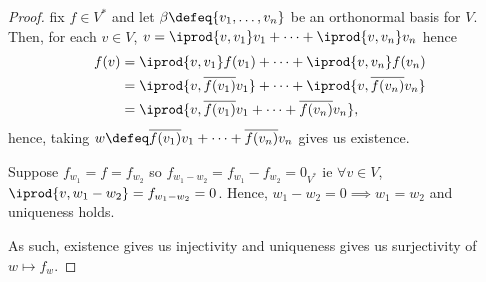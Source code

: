 \begin{proof}
     fix $f \in V^\ast$ and let $\beta \defeq \{v_1, \dots, v_n\}$ be an orthonormal basis for $V$. Then, for each $v\in V$, $v = \iprod{v, v_1} v_1 + \cdots + \iprod{v, v_n} v_n$ hence \begin{align*}
        f(v) &= \iprod{v, v_1} f(v_1) + \cdots + \iprod{v, v_n}f(v_n)\\
        &= \iprod{v, \overline{f(v_1)}v_1} + \cdots + \iprod{v, \overline{f(v_n)}v_n}\\
        &= \iprod{v, \overline{f(v_1)}v_1 + \cdots + \overline{f(v_n)}v_n},
    \end{align*}
    hence, taking $w \defeq \overline{f(v_1)}v_1 + \cdots + \overline{f(v_n)}v_n$ gives us existence.
    
     Suppose $f_{w_1} = f = f_{w_2}$ so $f_{w_1 - w_2} = f_{w_1} - f_{w_2} = 0_{V^\ast}$ ie $\forall v \in V$, $\iprod{v, w_1 - w_2} = f_{w_1 - w_2} = 0$. Hence, $w_1 - w_2 = 0 \implies w_1 = w_2$ and uniqueness holds.

    As such, existence gives us injectivity and uniqueness gives us surjectivity of $w \mapsto f_w$.
\end{proof}